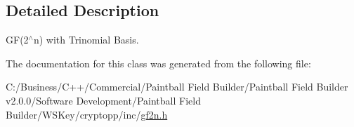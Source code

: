 \subsection{Detailed Description}
GF(2$^\wedge$n) with Trinomial Basis. 

The documentation for this class was generated from the following file:\begin{DoxyCompactItemize}
\item 
C:/Business/C++/Commercial/Paintball Field Builder/Paintball Field Builder v2.0.0/Software Development/Paintball Field Builder/WSKey/cryptopp/inc/\hyperlink{gf2n_8h}{gf2n.h}\end{DoxyCompactItemize}
